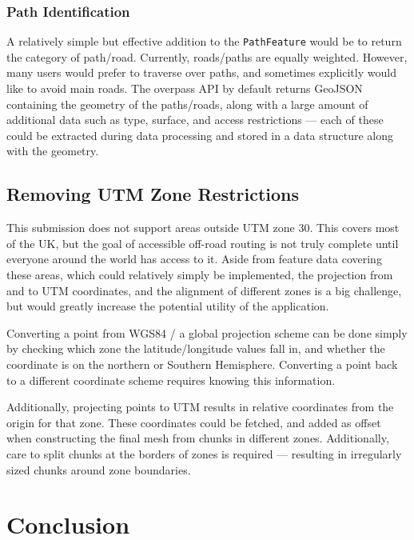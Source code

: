 \documentclass[12pt]{article}
\begin{document}
\subsubsection{Path Identification}

A relatively simple but effective addition to the \texttt{PathFeature} would be to return the category of path/road. Currently, roads/paths are equally weighted. However, many users would prefer to traverse over paths, and sometimes explicitly would like to avoid main roads. The overpass API by default returns GeoJSON containing the geometry of the paths/roads, along with a large amount of additional data such as type, surface, and access restrictions --- each of these could be extracted during data processing and stored in a data structure along with the geometry.

\subsection{Removing UTM Zone Restrictions}\label{section:improvements:zones}

This submission does not support areas outside UTM zone 30. This covers most of the UK, but the goal of accessible off-road routing is not truly complete until everyone around the world has access to it. Aside from feature data covering these areas, which could relatively simply be implemented, the projection from and to UTM coordinates, and the alignment of different zones is a big challenge, but would greatly increase the potential utility of the application.

Converting a point from WGS84 / a global projection scheme can be done simply by checking which zone the latitude/longitude values fall in, and whether the coordinate is on the northern or Southern Hemisphere. Converting a point back to a different coordinate scheme requires knowing this information.

Additionally, projecting points to UTM results in relative coordinates from the origin for that zone. These coordinates could be fetched, and added as offset when constructing the final mesh from chunks in different zones. Additionally, care to split chunks at the borders of zones is required --- resulting in irregularly sized chunks around zone boundaries.

\section{Conclusion}
\end{document}
